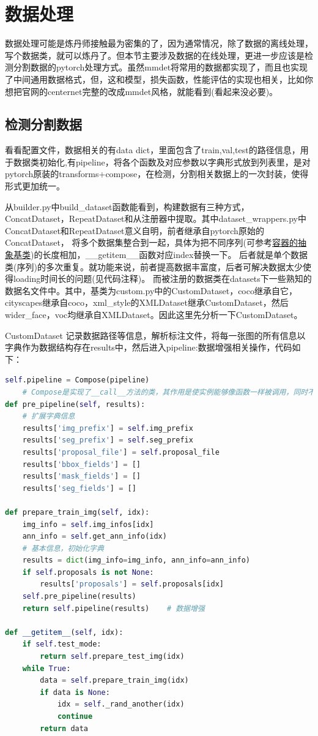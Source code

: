 \documentclass[UTF8]{ctexart}
\begin{document}
\section{数据处理}
\label{sec:detail}
数据处理可能是炼丹师接触最为密集的了，因为通常情况，除了数据的离线处理，写个数据类，就可以炼丹了。但本节主要涉及数据的在线处理，更进一步应该是检测分割数据的pytorch处理方式。虽然mmdet将常用的数据都实现了，而且也实现了中间通用数据格式，但，这和模型，损失函数，性能评估的实现也相关，比如你想把官网的centernet完整的改成mmdet风格，就能看到(看起来没必要)。

\subsection{检测分割数据}
看看配置文件，数据相关的有data dict，里面包含了train,val,test的路径信息，用于数据类初始化,有pipeline，将各个函数及对应参数以字典形式放到列表里，是对pytorch原装的transforms+compose，在检测，分割相关数据上的一次封装，使得形式更加统一。

从builder.py中build\_dataset函数能看到，构建数据有三种方式，ConcatDataset，RepeatDataset和从注册器中提取。其中dataset\_wrappers.py中ConcatDataset和RepeatDataset意义自明，前者继承自pytorch原始的ConcatDataset，
将多个数据集整合到一起，具体为把不同序列(可参考\href{https://docs.python.org/zh-cn/3/library/collections.abc.html}
{容器的抽象基类})的长度相加，\_\_getitem\_\_函数对应index替换一下。
后者就是单个数据类(序列)的多次重复。就功能来说，前者提高数据丰富度，后者可解决数据太少使得loading时间长的问题(见代码注释)。
而被注册的数据类在datasets下一些熟知的数据名文件中。其中，基类为custom.py中的CustomDataset，coco继承自它，
cityscapes继承自coco，xml\_style的XMLDataset继承CustomDataset，然后wider\_face，voc均继承自XMLDataset。因此这里先分析一下CustomDataset。

CustomDataset 记录数据路径等信息，解析标注文件，将每一张图的所有信息以字典作为数据结构存在results中，然后进入pipeline:数据增强相关操作，代码如下：

\lstset{style=mystyle}
\begin{lstlisting}[language=Python]
	self.pipeline = Compose(pipeline)   
	# Compose是实现了__call__方法的类，其作用是使实例能够像函数一样被调用，同时不影响实例本身的生命周期
def pre_pipeline(self, results):
	# 扩展字典信息
	results['img_prefix'] = self.img_prefix
	results['seg_prefix'] = self.seg_prefix
	results['proposal_file'] = self.proposal_file
	results['bbox_fields'] = []
	results['mask_fields'] = []
	results['seg_fields'] = []

def prepare_train_img(self, idx):
	img_info = self.img_infos[idx]
	ann_info = self.get_ann_info(idx)
	# 基本信息，初始化字典
	results = dict(img_info=img_info, ann_info=ann_info)
	if self.proposals is not None:
		results['proposals'] = self.proposals[idx]
	self.pre_pipeline(results)
	return self.pipeline(results)    # 数据增强

def __getitem__(self, idx):
	if self.test_mode:
		return self.prepare_test_img(idx)
	while True:
		data = self.prepare_train_img(idx)
		if data is None:
			idx = self._rand_another(idx)
			continue
		return data
\end{lstlisting}
\end{document}
